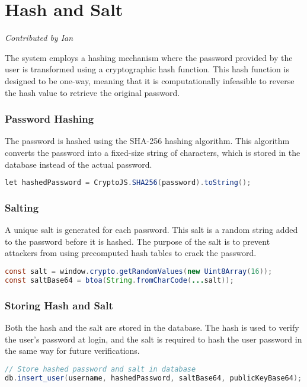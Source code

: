 \documentclass{article}
\begin{document}
\section{Hash and Salt}
\textit{Contributed by Ian}

The system employs a hashing mechanism where the password provided by the user is transformed using a cryptographic hash function. This hash function is designed to be one-way, meaning that it is computationally infeasible to reverse the hash value to retrieve the original password.

\subsubsection*{Password Hashing}
The password is hashed using the SHA-256 hashing algorithm. This algorithm converts the password into a fixed-size string of characters, which is stored in the database instead of the actual password.

\begin{lstlisting}[language=Java]
let hashedPassword = CryptoJS.SHA256(password).toString();
\end{lstlisting}

\subsubsection*{Salting}
A unique salt is generated for each password. This salt is a random string added to the password before it is hashed. The purpose of the salt is to prevent attackers from using precomputed hash tables to crack the password.

\begin{lstlisting}[language=Java]
const salt = window.crypto.getRandomValues(new Uint8Array(16));
const saltBase64 = btoa(String.fromCharCode(...salt));
\end{lstlisting}

\subsubsection*{Storing Hash and Salt}
Both the hash and the salt are stored in the database. The hash is used to verify the user's password at login, and the salt is required to hash the user password in the same way for future verifications.

\begin{lstlisting}[language=Java]
// Store hashed password and salt in database
db.insert_user(username, hashedPassword, saltBase64, publicKeyBase64);
\end{lstlisting}
\end{document}
